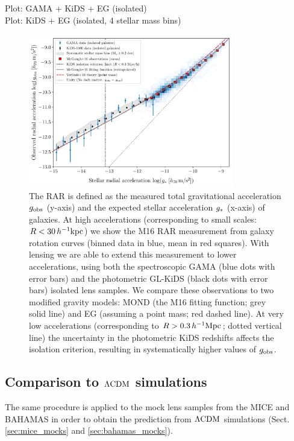 \documentclass[usenatbib]{mnras}
\newcommand{\hkpc}{\, h^{-1}{\rm{kpc}} }
\newcommand{\hMpc}{\, h^{-1}{\rm{Mpc}} }
\newcommand{\lcdm}{{\rm \Lambda CDM}}
\newcommand{\un}[1]{_{\rm #1}}
\begin{document}
Plot: GAMA + KiDS + EG (isolated) \\
Plot: KiDS + EG (isolated, 4 stellar mass bins)

\begin{figure}
	\includegraphics[width=0.8\textwidth]{Figures/RAR_KiDS+GAMA+Verlinde_Nobins_isolated_zoomout.pdf}
	\caption{The RAR is defined as the measured total gravitational acceleration $g\un{obs}$ (y-axis) and the expected stellar acceleration $g\un{*}$ (x-axis) of galaxies. At high accelerations (corresponding to small scales: $R < 30 \hkpc$) we show the M16 RAR measurement from galaxy rotation curves (binned data in blue, mean in red squares). With lensing we are able to extend this measurement to lower accelerations, using both the spectroscopic GAMA (blue dots with error bars) and the photometric GL-KiDS (black dots with error bars) isolated lens samples. We compare these observations to two modified gravity models: MOND (the M16 fitting function; grey solid line) and EG (assuming a point mass; red dashed line). At very low accelerations (corresponding to $R > 0.3 \hMpc$; dotted vertical line) the uncertainty in the photometric KiDS redshifts affects the isolation criterion, resulting in systematically higher values of $g\un{obs}$.} %
	\label{fig:RAR_kids_gama_iso}
\end{figure}

\subsection{Comparison to $\lcdm$ simulations}

The same procedure is applied to the mock lens samples from the MICE and BAHAMAS in order to obtain the prediction from $\lcdm$ simulations (Sect. \ref{sec:mice_mocks} and \ref{sec:bahamas_mocks}).
\end{document}
